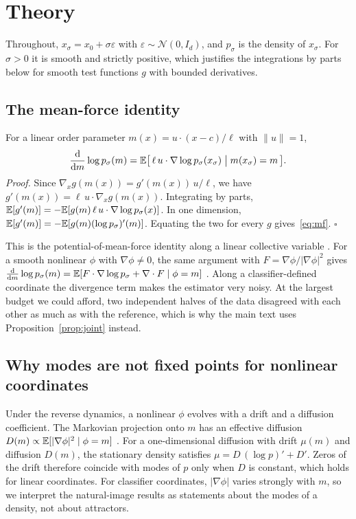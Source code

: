 \clearpage
\appendix

\section{Theory}
\label{app:theory}

Throughout, $x_\sigma=x_0+\sigma\varepsilon$ with $\varepsilon\sim\mathcal N(0,I_d)$, and $p_\sigma$ is the density of $x_\sigma$. For $\sigma>0$ it is smooth and strictly positive, which justifies the integrations by parts below for smooth test functions $g$ with bounded derivatives.

\subsection{The mean-force identity}
\label{app:identity}

For a linear order parameter $m(x)=u\cdot(x-c)/\ell$ with $\|u\|=1$,
\begin{equation}
\frac{\mathrm d}{\mathrm dm}\log p_\sigma(m)=\mathbb{E}\big[\,\ell\,u\cdot\nabla\log p_\sigma(x_\sigma)\;\big|\;m(x_\sigma)=m\,\big].
\label{eq:mf}
\end{equation}
\emph{Proof.} Since $\nabla_x g(m(x))=g'(m(x))\,u/\ell$, we have $g'(m(x))=\ell\,u\cdot\nabla_x g(m(x))$. Integrating by parts, $\mathbb{E}[g'(m)]=-\mathbb{E}[g(m)\,\ell\,u\cdot\nabla\log p_\sigma(x)]$. In one dimension, $\mathbb{E}[g'(m)]=-\mathbb{E}[g(m)(\log p_\sigma)'(m)]$. Equating the two for every $g$ gives~\eqref{eq:mf}. $\square$

This is the potential-of-mean-force identity along a linear collective variable \citep{kirkwood1935statistical}. For a smooth nonlinear $\phi$ with $\nabla\phi\neq0$, the same argument with $F=\nabla\phi/|\nabla\phi|^2$ gives $\frac{\mathrm d}{\mathrm dm}\log p_\sigma(m)=\mathbb{E}[F\cdot\nabla\log p_\sigma+\nabla\cdot F\mid\phi=m]$ \citep{carter1989constrained}. Along a classifier-defined coordinate the divergence term makes the estimator very noisy. At the largest budget we could afford, two independent halves of the data disagreed with each other as much as with the reference, which is why the main text uses Proposition~\ref{prop:joint} instead.

\subsection{Why modes are not fixed points for nonlinear coordinates}
\label{app:modes}

Under the reverse dynamics, a nonlinear $\phi$ evolves with a drift and a diffusion coefficient. The Markovian projection onto $m$ has an effective diffusion $D(m)\propto\mathbb{E}[|\nabla\phi|^2\mid\phi=m]$ \citep{gyongy1986mimicking}. For a one-dimensional diffusion with drift $\mu(m)$ and diffusion $D(m)$, the stationary density satisfies $\mu=D\,(\log p)'+D'$. Zeros of the drift therefore coincide with modes of $p$ only when $D$ is constant, which holds for linear coordinates. For classifier coordinates, $|\nabla\phi|$ varies strongly with $m$, so we interpret the natural-image results as statements about the modes of a density, not about attractors.

